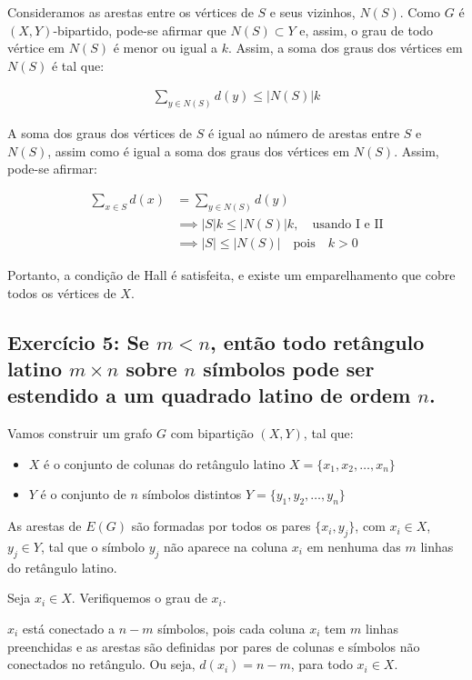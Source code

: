 \documentclass{article}
\begin{document}
Consideramos as arestas entre os vértices de $S$ e seus vizinhos, $N(S)$.  Como $G$ é $(X,Y)$-bipartido, pode-se afirmar que $N(S) \subset Y$ e, assim, o grau de todo vértice em $N(S)$ é menor ou igual a $k$. Assim, a soma dos graus dos vértices em $N(S)$ é tal que:

\begin{align}
	\sum_{y \in N(S)} d(y) \leq |N(S)|k \tag*{II} 
\end{align}

A soma dos graus dos vértices de $S$ é igual ao número de arestas entre $S$ e $N(S)$, assim como é igual a soma dos graus dos vértices em $N(S)$. Assim, pode-se afirmar:


\begin{align}
 	\sum_{x \in S} d(x) &= \sum_{y \in N(S)} d(y) \\
 	&\implies |S|k \leq  |N(S)|k, \quad \text{usando I e II} \\
 	&\implies |S| \leq |N(S)| \quad \text{pois} \quad k > 0
\end{align}

Portanto, a condição de Hall é satisfeita, e existe um emparelhamento que cobre todos os vértices de  $X$.

\clearpage


\subsection{Exercício 5:  Se  $m < n$, então todo retângulo latino $m \times n$ sobre $n$ símbolos pode ser estendido a um quadrado latino de ordem $n$.}


Vamos construir um grafo $G$ com bipartição $(X, Y)$, tal que:
\begin{itemize}
	\item $X$ é o conjunto de colunas do retângulo latino $X = \{x_1, x_2, \dots, x_n\}$
	\item $Y$ é o conjunto de $n$ símbolos distintos $Y = \{y_1, y_2, \dots, y_n\}$
\end{itemize}

As arestas de $E(G)$ são formadas por todos os pares $ \{x_i, y_j\}$, com $x_i \in X$, $y_j \in Y$, tal que o símbolo $ y_j$ não aparece na coluna $x_i$ em nenhuma das $m$ linhas do retângulo latino.

Seja  $x_i \in X$. Verifiquemos o grau de  $x_i$.

$x_i$ está conectado a $n - m$ símbolos, pois cada coluna $x_i$ tem $m$ linhas preenchidas e as arestas são definidas por pares de colunas e símbolos não conectados no retângulo. Ou seja, $d(x_i) = n - m$, para todo  $x_i \in X$.
\end{document}

